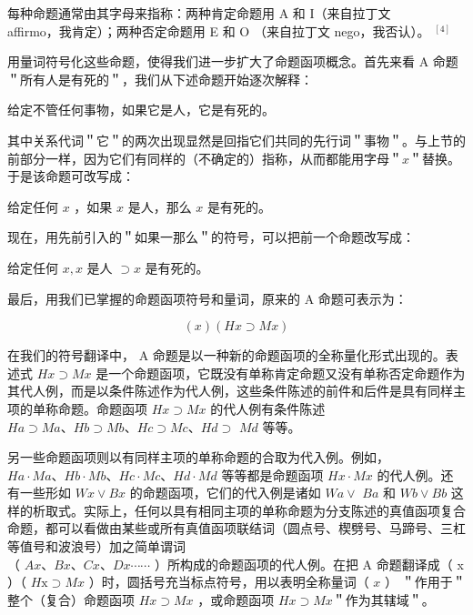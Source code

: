 每种命题通常由其字母来指称：两种肯定命题用 A 和 I（来自拉丁文\\
affirmo，我肯定）；两种否定命题用 E 和 O （来自拉丁文 nego，我否认）。 ${ }^{[4]}$

用量词符号化这些命题，使得我们进一步扩大了命题函项概念。首先来看 A 命题＂所有人是有死的＂，我们从下述命题开始逐次解释：

给定不管任何事物，如果它是人，它是有死的。

其中关系代词＂它＂的两次出现显然是回指它们共同的先行词＂事物＂。与上节的前部分一样，因为它们有同样的（不确定的）指称，从而都能用字母＂$x$＂替换。于是该命题可改写成：

给定任何 $x$ ，如果 $x$ 是人，那么 $x$ 是有死的。

现在，用先前引入的＂如果一那么＂的符号，可以把前一个命题改写成：

给定任何 $x, x$ 是人 $\supset x$ 是有死的。

最后，用我们已掌握的命题函项符号和量词，原来的 A 命题可表示为：

$$
(x)(H x \supset M x)
$$

在我们的符号翻译中， A 命题是以一种新的命题函项的全称量化形式出现的。表述式 $H x \supset M x$ 是一个命题函项，它既没有单称肯定命题又没有单称否定命题作为其代人例，而是以条件陈述作为代人例，这些条件陈述的前件和后件是具有同样主项的单称命题。命题函项 $H x \supset M x$ 的代人例有条件陈述 $H a \supset M a 、 H b \supset M b 、 H c \supset M c 、 H d \supset$ $M d$ 等等。

另一些命题函项则以有同样主项的单称命题的合取为代入例。例如， $H a \cdot M a 、 H b \cdot M b 、 H c \cdot M c 、 H d \cdot M d$ 等等都是命题函项 $H x \cdot M x$ 的代人例。还有一些形如 $W x \vee B x$ 的命题函项，它们的代入例是诸如 $W a \vee$ $B a$ 和 $W b \vee B b$ 这样的析取式。实际上，任何以具有相同主项的单称命题为分支陈述的真值函项复合命题，都可以看做由某些或所有真值函项联结词（圆点号、楔劈号、马蹄号、三杠等值号和波浪号）加之简单谓词\\
（ $A x 、 B x 、 C x 、 D x \cdots \cdots$ ）所构成的命题函项的代人例。在把 A 命题翻译成（ x ）（ $H \mathrm{x} \supset M x$ ）时，圆括号充当标点符号，用以表明全称量词（ $x$ ） ＂作用于＂整个（复合）命题函项 $H x \supset M x$ ，或命题函项 $H x \supset M x$＂作为其辖域＂。

